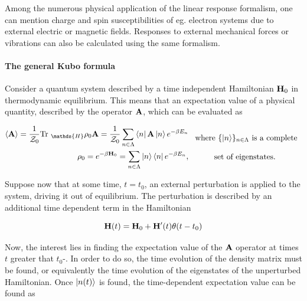 \documentclass{homework}
\begin{document}
Among the numerous physical application of the linear response formalism, one can mention charge and spin susceptibilities of eg. electron systems due to external electric or magnetic fields. Responses to external mechanical forces or vibrations can also be calculated using the same formalism. \\

\paragraph{\textbf{The general Kubo formula}}

Consider a quantum system described by a time independent Hamiltonian ${\bf H}_0$ in thermodynamic equilibrium. This means that an expectation value of a physical quantity, described by the operator ${\bf A}$, which can be evaluated as 

\begin{equation}
    \begin{split}
        \langle {\bf A} \rangle = \frac{1}{\mathcal{Z}_0} \textnormal{Tr }_{\mathds{H}} \rho_0 {\bf A}  = \frac{1}{\mathcal{Z}_0} \sum_{n \in \Lambda} \bra{n} {{\bf A}} \ket{n} e^{-\beta E_n} \\
        \rho_0 = e^{-\beta {\bf H}_0} = \sum_{n \in \Lambda} \ket{n} \bra{n} e^{-\beta E_n},
    \end{split} \begin{array}{c}
         \textnormal{ where $\{\ket{n}\}_{n \in \Lambda}$ is a complete} \\
         \\
         \textnormal{set of eigenstates}.
    \end{array}
\end{equation}

Suppose now that at some time, $t = t_0$, an external perturbation is applied to the system, driving it out of equilibrium. The perturbation is described by an additional time dependent term in the Hamiltonian 

\begin{equation}
    {\bf H}(t) = {\bf H}_0 + {\bf H}'(t) \theta(t-t_0)
\end{equation}

Now, the interest lies in finding the expectation value of the ${\bf A}$ operator at times $t$ greater that $t_0$-. In order to do so, the time evolution of the density matrix must be found, or equivalently the time evolution of the eigenstates of the unperturbed Hamiltonian. Once $\ket{n(t)}$ is found, the time-dependent expectation value can be found as 
\end{document}
